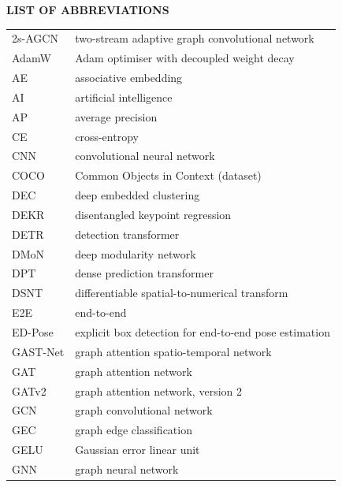 
{
  \thispagestyle{empty}

  {\bfseries\Large LIST OF ABBREVIATIONS}

  \vspace*{1cm}

  \begin{longtable}{p{3cm}l}
    2s-AGCN        & two-stream adaptive graph convolutional network \\
    AdamW          & Adam optimiser with decoupled weight decay \\
    AE             & associative embedding \\
    AI             & artificial intelligence \\
    AP             & average precision \\
    CE             & cross-entropy \\
    CNN            & convolutional neural network \\
    COCO           & Common Objects in Context (dataset) \\
    DEC            & deep embedded clustering \\
    DEKR           & disentangled keypoint regression \\
    DETR           & detection transformer \\
    DMoN           & deep modularity network \\
    DPT            & dense prediction transformer \\
    DSNT           & differentiable spatial-to-numerical transform \\
    E2E            & end-to-end \\
    ED-Pose        & explicit box detection for end-to-end pose estimation \\
    GAST-Net       & graph attention spatio-temporal network \\
    GAT            & graph attention network \\
    GATv2          & graph attention network, version 2 \\
    GCN            & graph convolutional network \\
    GEC            & graph edge classification \\
    GELU           & Gaussian error linear unit \\
    GNN            & graph neural network \\

\end{longtable}}
